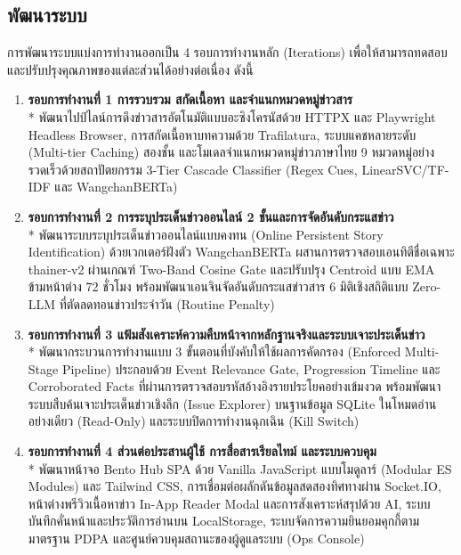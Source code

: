 \subsection{พัฒนาระบบ}

การพัฒนาระบบแบ่งการทำงานออกเป็น 4 รอบการทำงานหลัก (Iterations) เพื่อให้สามารถทดสอบและปรับปรุงคุณภาพของแต่ละส่วนได้อย่างต่อเนื่อง ดังนี้

\begin{enumerate}
    \item \textbf{รอบการทำงานที่ 1 การรวบรวม สกัดเนื้อหา และจำแนกหมวดหมู่ข่าวสาร}\\*
    พัฒนาไปป์ไลน์การดึงข่าวสารอัตโนมัติแบบอะซิงโครนัสด้วย HTTPX และ Playwright Headless Browser, การสกัดเนื้อหาบทความด้วย Trafilatura, ระบบแคชหลายระดับ (Multi-tier Caching) สองชั้น และโมเดลจำแนกหมวดหมู่ข่าวภาษาไทย 9 หมวดหมู่อย่างรวดเร็วด้วยสถาปัตยกรรม 3-Tier Cascade Classifier (Regex Cues, LinearSVC/TF-IDF และ WangchanBERTa)
    \item \textbf{รอบการทำงานที่ 2 การระบุประเด็นข่าวออนไลน์ 2 ชั้นและการจัดอันดับกระแสข่าว}\\*
    พัฒนาระบบระบุประเด็นข่าวออนไลน์แบบคงทน (Online Persistent Story Identification) ด้วยเวกเตอร์ฝังตัว WangchanBERTa ผสานการตรวจสอบเอนทิตีชื่อเฉพาะ thainer-v2 ผ่านเกณฑ์ Two-Band Cosine Gate และปรับปรุง Centroid แบบ EMA ข้ามหน้าต่าง 72 ชั่วโมง พร้อมพัฒนาเอนจินจัดอันดับกระแสข่าวสาร 6 มิติเชิงสถิติแบบ Zero-LLM ที่ตัดลดทอนข่าวประจำวัน (Routine Penalty)
    \item \textbf{รอบการทำงานที่ 3 แฟ้มสังเคราะห์ความคืบหน้าจากหลักฐานจริงและระบบเจาะประเด็นข่าว}\\*
    พัฒนากระบวนการทำงานแบบ 3 ขั้นตอนที่บังคับให้ใช้ผลการคัดกรอง (Enforced Multi-Stage Pipeline) ประกอบด้วย Event Relevance Gate, Progression Timeline และ Corroborated Facts ที่ผ่านการตรวจสอบรหัสอ้างอิงรายประโยคอย่างเข้มงวด พร้อมพัฒนาระบบสืบค้นเจาะประเด็นข่าวเชิงลึก (Issue Explorer) บนฐานข้อมูล SQLite ในโหมดอ่านอย่างเดียว (Read-Only) และระบบปิดการทำงานฉุกเฉิน (Kill Switch)
    \item \textbf{รอบการทำงานที่ 4 ส่วนต่อประสานผู้ใช้ การสื่อสารเรียลไทม์ และระบบควบคุม}\\*
    พัฒนาหน้าจอ Bento Hub SPA ด้วย Vanilla JavaScript แบบโมดูลาร์ (Modular ES Modules) และ Tailwind CSS, การเชื่อมต่อผลักดันข้อมูลสดสองทิศทางผ่าน Socket.IO, หน้าต่างพรีวิวเนื้อหาข่าว In-App Reader Modal และการสังเคราะห์สรุปด้วย AI, ระบบบันทึกคั่นหน้าและประวัติการอ่านบน LocalStorage, ระบบจัดการความยินยอมคุกกี้ตามมาตรฐาน PDPA และศูนย์ควบคุมสถานะของผู้ดูแลระบบ (Ops Console)
\end{enumerate}

